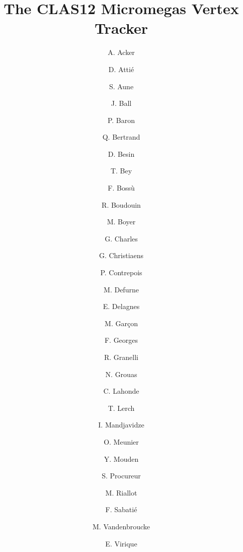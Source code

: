 \title{The CLAS12 Micromegas Vertex Tracker}

\author{A. Acker} 
\author{D. Atti\'e}
\author{S. Aune}
\author{J. Ball}
\author{P. Baron}
\author{Q. Bertrand}
\author{D. Besin}
\author{T. Bey}
\author{F. Boss\`u}
\author{R. Boudouin}
\author{M. Boyer}
\author{G. Charles}
\author{G. Christiaens}
\author{P. Contrepois}
\author{M. Defurne}
\author{E. Delagnes}
\author{M. Gar\c con}
\author{F. Georges}
\author{R. Granelli}
\author{N. Grouas}
\author{C. Lahonde}
\author{T. Lerch}
\author{I. Mandjavidze}
\author{O. Meunier}
\author{Y. Mouden}
\author{S. Procureur}
\author{M. Riallot}
\author{F. Sabati\'e}
\author{M. Vandenbroucke}
\author{E. Virique}

\address{IRFU, CEA, Universit\'{e} Paris-Saclay, 91191, Gif-sur-Yvette, France}
